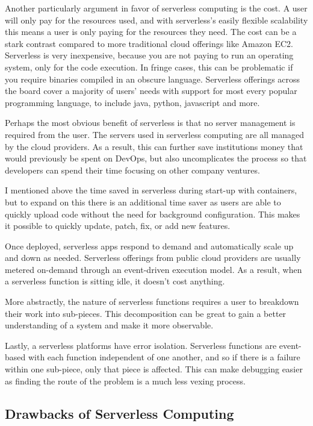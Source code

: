 \documentclass[10pt, conference]{IEEEtran}
\begin{document}
Another particularly argument in favor of serverless computing is the cost. A user will only pay for the resources used, and with serverless's easily flexible scalability this means a user is only paying for the resources they need. The cost can be a stark contrast compared to more traditional cloud offerings like Amazon EC2. Serverless is very inexpensive, because you are not paying to run an operating system, only for the code execution. In fringe cases, this can be problematic if you require binaries compiled in an obscure language. Serverless offerings across the board cover a majority of users' needs with support for most every popular programming language, to include java, python, javascript and more. 

Perhaps the most obvious benefit of serverless is that no server management is required from the user. The servers used in serverless computing are all managed by the cloud providers. As a result, this can further save institutions money that would previously be spent on DevOps, but also uncomplicates the process so that developers can spend their time focusing on other company ventures. 

I mentioned above the time saved in serverless during start-up with containers, but to expand on this there is an additional time saver as users are able to quickly upload code without the need for background configuration. This makes it possible to quickly update, patch, fix, or add new features. 

Once deployed, serverless apps respond to demand and automatically scale up and down as needed. Serverless offerings from public cloud providers are usually metered on-demand through an event-driven execution model. As a result, when a serverless function is sitting idle, it doesn’t cost anything.

More abstractly, the nature of serverless functions requires a user to breakdown their work into sub-pieces. This decomposition can be great to gain a better understanding of a system and make it more observable. 

Lastly, a serverless platforms have error isolation. Serverless functions are event-based with each function independent of one another, and so if there is a failure within one sub-piece, only that piece is affected. This can make debugging easier as finding the route of the problem is a much less vexing process. 

\subsection{Drawbacks of Serverless Computing}
\end{document}
